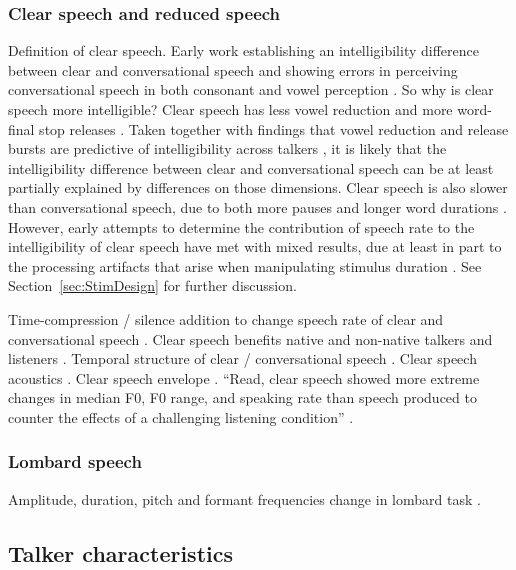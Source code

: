 \subsubsection{Clear speech and reduced speech}
Definition of clear speech.  
Early work establishing an intelligibility difference between clear and conversational speech and showing errors in perceiving conversational speech in both consonant and vowel perception \citep{PichenyEtAl1985}.  So why is clear speech more intelligible?  Clear speech has less vowel reduction and more word-final stop releases \citep{PichenyEtAl1986}.  Taken together with findings that vowel reduction and release bursts are predictive of intelligibility across talkers \citep{xxx,LiLoizou2008}, it is likely that the intelligibility difference between clear and conversational speech can be at least partially explained by differences on those dimensions.  Clear speech is also slower than conversational speech, due to both more pauses and longer word durations \citep{PichenyEtAl1986}.  However, early attempts to determine the contribution of speech rate to the intelligibility of clear speech have met with mixed results, due at least in part to the processing artifacts that arise when manipulating stimulus duration \citep{PichenyEtAl1989, UchanskiEtAl1996, LiuZeng2006}.  See Section~\ref{sec:StimDesign} for further discussion.

Time-compression / silence addition to change speech rate of clear and conversational speech \citep{LiuZeng2006}.  
Clear speech benefits native and non-native talkers and listeners \citep{SmiljanicBradlow2011}.  
Temporal structure of clear / conversational speech \citep{SmiljanicBradlow2008}.  
Clear speech acoustics \citep{KrauseBraida2004}.  
Clear speech envelope \citep{KrauseBraida2009}.  
“Read, clear speech showed more extreme changes in median F0, F0 range, and speaking rate than speech produced to counter the effects of a challenging listening condition” \citep{HazanBaker2011}.

\subsubsection{Lombard speech}
Amplitude, duration, pitch and formant frequencies change in lombard task \citep{SummersEtAl1988}.

\subsection{Talker characteristics}

